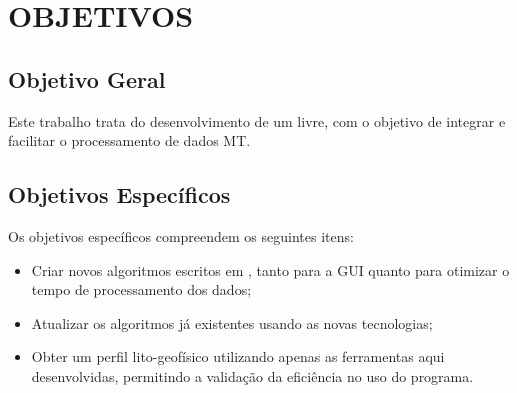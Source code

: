 \chapter{OBJETIVOS}

	\section{Objetivo Geral}
        Este trabalho trata do desenvolvimento de um  livre, com o objetivo de integrar e facilitar o processamento de dados MT.
    
    \section{Objetivos Específicos}
        
        Os objetivos específicos compreendem os seguintes itens:
        
        \begin{itemize}
            \item Criar novos algoritmos escritos em \Python, tanto para a GUI quanto para otimizar o tempo de processamento dos dados;
            \item Atualizar os algoritmos já existentes usando as novas tecnologias;
            \item Obter um perfil lito-geofísico utilizando apenas as ferramentas aqui desenvolvidas, permitindo a validação da eficiência no uso do programa.
        \end{itemize}
